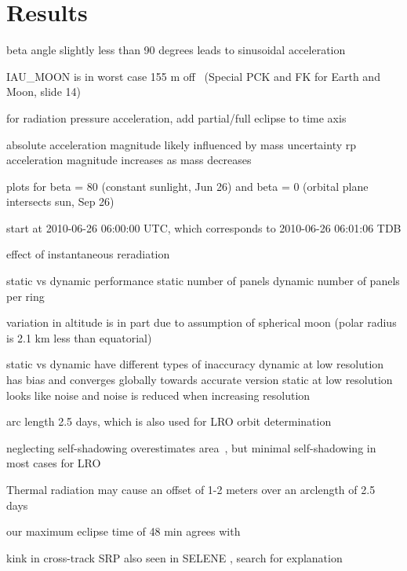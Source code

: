 \section{Results}

beta angle slightly less than 90 degrees leads to sinusoidal acceleration

IAU\_MOON is in worst case 155 m off~\cite{NAIF2020} (Special PCK and FK for Earth and Moon, slide 14)

for radiation pressure acceleration, add partial/full eclipse to time axis

absolute acceleration magnitude likely influenced by mass uncertainty
rp acceleration magnitude increases as mass decreases

plots for beta = 80 (constant sunlight, Jun 26) and beta = 0 (orbital plane intersects sun, Sep 26)

start at 2010-06-26 06:00:00 UTC, which corresponds to 2010-06-26 06:01:06 TDB

effect of instantaneous reradiation

static vs dynamic performance
static number of panels
dynamic number of panels per ring

variation in altitude is in part due to assumption of spherical moon (polar radius is 2.1 km less than equatorial)

static vs dynamic have different types of inaccuracy
dynamic at low resolution has bias and converges globally towards accurate version
static at low resolution looks like noise and noise is reduced when increasing resolution

arc length 2.5 days, which is also used for LRO orbit determination~\cite{Mazarico2011}

neglecting self-shadowing overestimates area~\cite{Mazarico2009}, but minimal self-shadowing in most cases for LRO~\cite{Slojkowski2015}

Thermal radiation may cause an offset of 1-2 meters over an arclength of 2.5 days~\cite{Bauer2016}

our maximum eclipse time of 48 min agrees with \cite{Tooley2010}

kink in cross-track SRP also seen in SELENE \cite{Kubooka1999}, search for explanation
